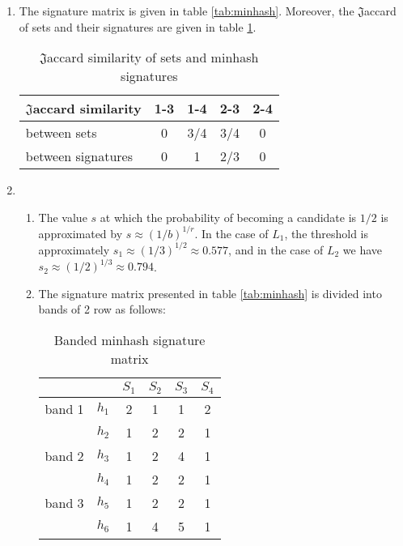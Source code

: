 \documentclass[DIN, pagenumber=false, fontsize=11pt, parskip=half]{scrartcl}
\begin{document}
\begin{enumerate}[label=\alph*)]

\item %

The signature matrix is given in table \ref{tab:minhash}. Moreover, the $\mathfrak{J}$accard of sets and their signatures are given in table \ref{tab:jhash}.

\begin{table}[!hb]
    \centering
    \begin{tabular}{l||c|c|c|c}
        $\mathfrak{J}$accard similarity & 1-3 & 1-4 & 2-3 & 2-4 \\
        \hline \hline
        between sets       & 0 & 3/4 & 3/4 & 0 \\
        between signatures & 0 & 1 & 2/3 & 0
    \end{tabular}
    \caption{$\mathfrak{J}$accard similarity of sets and minhash signatures}
    \label{tab:jhash}
\end{table}

\item

\begin{enumerate}[label=(\alph*)]

\item

The value $s$ at which the probability of becoming a candidate is $1/2$ is approximated by $s \approx (1/b)^{1/r}$. In the case of $L_1$, the threshold is approximately $s_1 \approx (1/3)^{1/2} \approx 0.577$, and in the case of $L_2$ we have $s_2 \approx (1/2)^{1/3} \approx 0.794$.

\item

The signature matrix presented in table \ref{tab:minhash} is divided into bands of 2 row as follows:

\begin{table}[!hb]
    \centering
    \begin{tabular}{lccccc}
        && $S_1$ & $S_2$ & $S_3$ & $S_4$ \\
        \hline
        band 1
        & $h_1$ & 2 & 1 & 1 & 2 \\
        & $h_2$ & 1 & 2 & 2 & 1 \\
        \hline
        band 2
        & $h_3$ & 1 & 2 & 4 & 1 \\
        & $h_4$ & 1 & 2 & 2 & 1 \\
        \hline
        band 3
        & $h_5$ & 1 & 2 & 2 & 1 \\
        & $h_6$ & 1 & 4 & 5 & 1 \\
        \hline
    \end{tabular}
    \caption{Banded minhash signature matrix}
    \label{tab:minhash_band}
\end{table}


\end{enumerate}
\end{enumerate}
\end{document}
